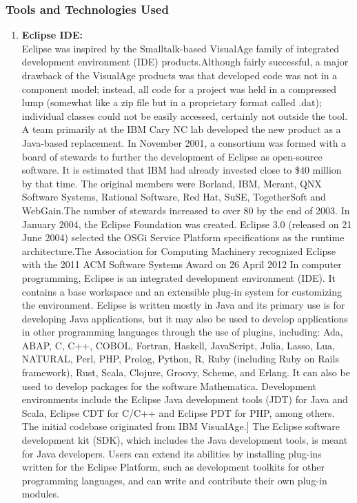 \documentclass[10pt,a4paper]
{article}
\numberwithin{table}{section}
\begin{document}
{{\begin{normalsize}
  \subsubsection{Tools and Technologies Used}
  \begin{enumerate}
\item \textbf{Eclipse IDE:}\\
\hspace*{0.3cm}Eclipse was inspired by the Smalltalk-based VisualAge family of integrated development environment (IDE) products.Although fairly successful, a major drawback of the VisualAge products was that developed code was not in a component model; instead, all code for a project was held in a compressed lump (somewhat like a zip file but in a proprietary format called .dat); individual classes could not be easily accessed, certainly not outside the tool. A team primarily at the IBM Cary NC lab developed the new product as a Java-based replacement. In November 2001, a consortium was formed with a board of stewards to further the development of Eclipse as open-source software. It is estimated that IBM had already invested close to \$40 million by that time. The original members were Borland, IBM, Merant, QNX Software Systems, Rational Software, Red Hat, SuSE, TogetherSoft and WebGain.The number of stewards increased to over 80 by the end of 2003. In January 2004, the Eclipse Foundation was created.
Eclipse 3.0 (released on 21 June 2004) selected the OSGi Service Platform specifications as the runtime architecture.The Association for Computing Machinery recognized Eclipse with the 2011 ACM Software Systems Award on 26 April 2012  
\hspace*{0.3cm}In computer programming, Eclipse is an integrated development environment (IDE). It contains a base workspace and an extensible plug-in system for customizing the environment. Eclipse is written mostly in Java and its primary use is for developing Java applications, but it may also be used to develop applications in other programming languages through the use of plugins, including: Ada, ABAP, C, C++, COBOL, Fortran, Haskell, JavaScript, Julia, Lasso, Lua, NATURAL, Perl, PHP, Prolog, Python, R, Ruby (including Ruby on Rails framework), Rust, Scala, Clojure, Groovy, Scheme, and Erlang. It can also be used to develop packages for the software Mathematica. Development environments include the Eclipse Java development tools (JDT) for Java and Scala, Eclipse CDT for C/C++ and Eclipse PDT for PHP, among others.\\
\hspace*{0.3cm}The initial codebase originated from IBM VisualAge.] The Eclipse software development kit (SDK), which includes the Java development tools, is meant for Java developers. Users can extend its abilities by installing plug-ins written for the Eclipse Platform, such as development toolkits for other programming languages, and can write and contribute their own plug-in modules.\\

\end{enumerate}
\end{normalsize}}}
\end{document}

